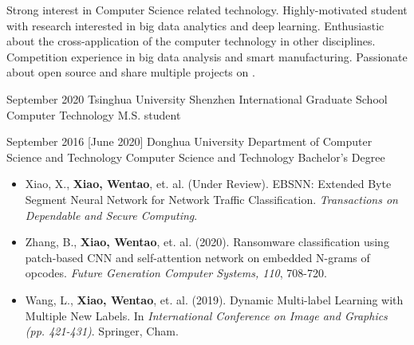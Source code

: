 \documentclass{resume}
\begin{document}
\makeheader

Strong interest in Computer Science related technology.
Highly-motivated student with research interested in big data analytics and deep learning.
Enthusiastic about the cross-application of the computer technology in other disciplines.
Competition experience in big data analysis and smart manufacturing.
Passionate about open source and share multiple projects on .

\begin{educations}
  \education%
    {September 2020}%
    {Tsinghua University}%
    {Shenzhen International Graduate School}%
    {Computer Technology}%
    {M.S. student}

  \separator{0.5ex}
  \education%
    {September 2016}%
    [June 2020]%
    {Donghua University}%
    {Department of Computer Science and Technology}%
    {Computer Science and Technology}%
    {Bachelor's Degree}
\end{educations}

\begin{itemize}
  \item Xiao, X., \textbf{Xiao, Wentao}, et. al. (Under Review). EBSNN: Extended Byte Segment Neural Network for Network Traffic Classification. \textit{Transactions on Dependable and Secure Computing}.
  \item Zhang, B., \textbf{Xiao, Wentao}, et. al. (2020). Ransomware classification using patch-based CNN and self-attention network on embedded N-grams of opcodes. \textit{Future Generation Computer Systems, 110}, 708-720.
  \item Wang, L., \textbf{Xiao, Wentao}, et. al. (2019). Dynamic Multi-label Learning with Multiple New Labels. In \textit{International Conference on Image and Graphics (pp. 421-431)}. Springer, Cham.
\end{itemize}

\begin{competences}[10em]
\end{competences}
\end{document}
